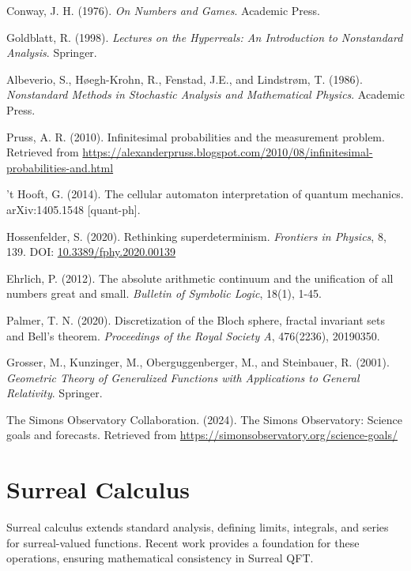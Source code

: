 \documentclass{article}
\begin{document}
\begin{thebibliography}{9}
 Conway, J. H. (1976). \emph{On Numbers and Games}. Academic Press.

 Goldblatt, R. (1998). \emph{Lectures on the Hyperreals: An Introduction to Nonstandard Analysis}. Springer.

 Albeverio, S., Høegh-Krohn, R., Fenstad, J.E., and Lindstrøm, T. (1986). \emph{Nonstandard Methods in Stochastic Analysis and Mathematical Physics}. Academic Press.

 Pruss, A. R. (2010). Infinitesimal probabilities and the measurement problem. Retrieved from \url{https://alexanderpruss.blogspot.com/2010/08/infinitesimal-probabilities-and.html}

 't Hooft, G. (2014). The cellular automaton interpretation of quantum mechanics. arXiv:1405.1548 [quant-ph].

 Hossenfelder, S. (2020). Rethinking superdeterminism. \emph{Frontiers in Physics}, 8, 139. DOI: \href{https://doi.org/10.3389/fphy.2020.00139}{10.3389/fphy.2020.00139}

 Ehrlich, P. (2012). The absolute arithmetic continuum and the unification of all numbers great and small. \emph{Bulletin of Symbolic Logic}, 18(1), 1-45.

 Palmer, T. N. (2020). Discretization of the Bloch sphere, fractal invariant sets and Bell's theorem. \emph{Proceedings of the Royal Society A}, 476(2236), 20190350.

 Grosser, M., Kunzinger, M., Oberguggenberger, M., and Steinbauer, R. (2001). \emph{Geometric Theory of Generalized Functions with Applications to General Relativity}. Springer.

 The Simons Observatory Collaboration. (2024). The Simons Observatory: Science goals and forecasts. Retrieved from \url{https://simonsobservatory.org/science-goals/}
\end{thebibliography}

\appendix
\section{Surreal Calculus}
Surreal calculus extends standard analysis, defining limits, integrals, and series for surreal-valued functions. Recent work \cite{Ehrlich2012} provides a foundation for these operations, ensuring mathematical consistency in Surreal QFT.
\end{document}
